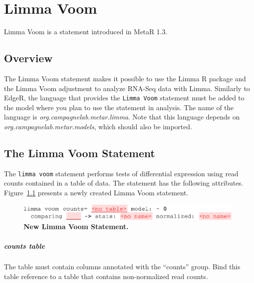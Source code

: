 

\chapter{Limma Voom}\label{chap:LimmaVoom}

\begin{remark}
Limma Voom is a statement introduced in MetaR 1.3.
\end{remark}
\section{Overview}
The Limma Voom statement makes it possible to use the Limma R package and the Limma Voom adjustment to analyze RNA-Seq data with Limma. Similarly to EdgeR, the language that provides the \texttt{Limma Voom} statement must be added to the model where you plan to use the statement in analysis. The name of the language is \textit{org.campagnelab.metar.limma}. Note that this language depends on \textit{org.campagnelab.metar.models}, which should also be imported.


\section{The Limma Voom Statement}
The \texttt{limma voom} statement performs tests of differential expression using read counts contained in a table of data. The statement has the following attributes. Figure~\ref{fig:NewLimmaVoom} presents a newly created Limma Voom statement.
\begin{figure}[h!tbp]
  \centering
  \includegraphics[width=\figWidthWide]{figures/NewLimmaVoom.pdf}
\caption[New Limma Voom Statement.]{\textbf{New Limma Voom Statement.}}
\label{fig:NewLimmaVoom}
\end{figure}
\paragraph{counts table}
The table must contain columns annotated with the ``counts'' group. Bind this table reference to a table that contains non-normalized read counts.


